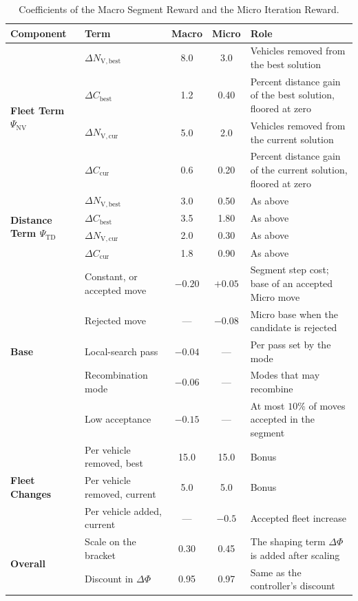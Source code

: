 \documentclass{article}
\newcommand{\NVs}[1]{N_{\mathrm{V},\text{#1}}}
\begin{document}
\begin{table}[!htbp]
\caption{Coefficients of the Macro Segment Reward and the Micro Iteration Reward.}
\label{tab:supp_reward_coefficients}
\centering
\small
\begin{tabularx}{\textwidth}{l l c c X}
\toprule
\textbf{Component} & \textbf{Term} & \textbf{Macro} & \textbf{Micro} & \textbf{Role} \\
\midrule
\multirow{4}{*}{\textbf{Fleet Term $\Psi_{\mathrm{NV}}$}}
 & $\Delta \NVs{best}$ & 8.0 & 3.0 & Vehicles removed from the best solution \\
 & $\Delta C_{\text{best}}$ & 1.2 & 0.40 & Percent distance gain of the best solution, floored at zero \\
 & $\Delta \NVs{cur}$ & 5.0 & 2.0 & Vehicles removed from the current solution \\
 & $\Delta C_{\text{cur}}$ & 0.6 & 0.20 & Percent distance gain of the current solution, floored at zero \\
\midrule
\multirow{4}{*}{\textbf{Distance Term $\Psi_{\mathrm{TD}}$}}
 & $\Delta \NVs{best}$ & 3.0 & 0.50 & As above \\
 & $\Delta C_{\text{best}}$ & 3.5 & 1.80 & As above \\
 & $\Delta \NVs{cur}$ & 2.0 & 0.30 & As above \\
 & $\Delta C_{\text{cur}}$ & 1.8 & 0.90 & As above \\
\midrule
\multirow{5}{*}{\textbf{Base}}
 & Constant, or accepted move & $-0.20$ & $+0.05$ & Segment step cost; base of an accepted Micro move \\
 & Rejected move & --- & $-0.08$ & Micro base when the candidate is rejected \\
 & Local-search pass & $-0.04$ & --- & Per pass set by the mode \\
 & Recombination mode & $-0.06$ & --- & Modes that may recombine \\
 & Low acceptance & $-0.15$ & --- & At most $10\%$ of moves accepted in the segment \\
\midrule
\multirow{3}{*}{\textbf{Fleet Changes}}
 & Per vehicle removed, best & 15.0 & 15.0 & Bonus \\
 & Per vehicle removed, current & 5.0 & 5.0 & Bonus \\
 & Per vehicle added, current & --- & $-0.5$ & Accepted fleet increase \\
\midrule
\multirow{2}{*}{\textbf{Overall}}
 & Scale on the bracket & 0.30 & 0.45 & The shaping term $\Delta\Phi$ is added after scaling \\
 & Discount in $\Delta\Phi$ & 0.95 & 0.97 & Same as the controller's discount \\
\bottomrule
\end{tabularx}
\end{table}
\end{document}
